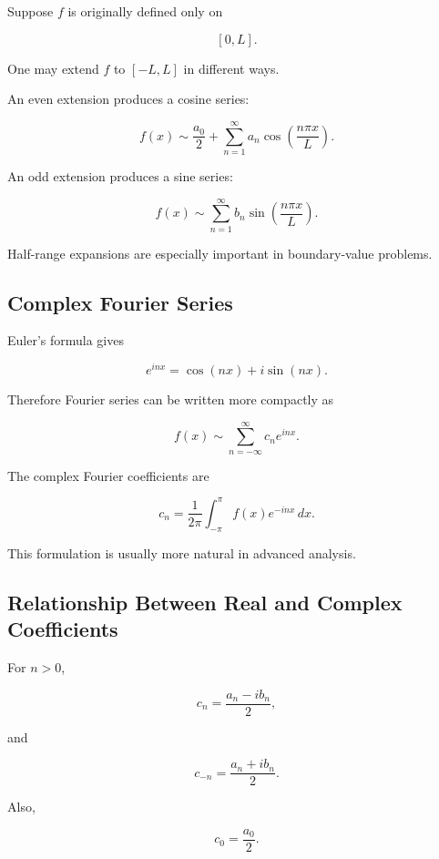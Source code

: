 Suppose \(f\) is originally defined only on

\[
[0,L].
\]

One may extend \(f\) to \([-L,L]\) in different ways.

An even extension produces a cosine series:

\[
\boxed{
f(x)
\sim
\frac{a_0}{2}
+
\sum_{n=1}^{\infty}
a_n
\cos\left(\frac{n\pi x}{L}\right).
}
\]

An odd extension produces a sine series:

\[
\boxed{
f(x)
\sim
\sum_{n=1}^{\infty}
b_n
\sin\left(\frac{n\pi x}{L}\right).
}
\]

Half-range expansions are especially important in boundary-value
problems.

\subsection{Complex Fourier Series}
\label{subsec:complex-fourier-series}

Euler's formula gives

\[
e^{inx}
=
\cos(nx)+i\sin(nx).
\]

Therefore Fourier series can be written more compactly as

\[
\boxed{
f(x)
\sim
\sum_{n=-\infty}^{\infty}
c_ne^{inx}.
}
\]

The complex Fourier coefficients are

\[
\boxed{
c_n
=
\frac{1}{2\pi}
\int_{-\pi}^{\pi}
f(x)e^{-inx}\,dx.
}
\]

This formulation is usually more natural in advanced analysis.

\subsection{Relationship Between Real and Complex Coefficients}
\label{subsec:real-complex-fourier-coefficients}

For \(n>0\),

\[
\boxed{
c_n
=
\frac{a_n-ib_n}{2},
}
\]

and

\[
\boxed{
c_{-n}
=
\frac{a_n+ib_n}{2}.
}
\]

Also,

\[
\boxed{
c_0=\frac{a_0}{2}.
}
\]

